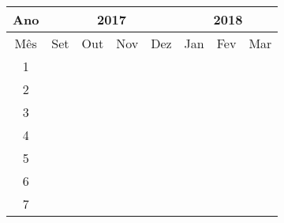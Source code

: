 \begin{tabular}{c|c|c|c|c|c|c|c} \hline
	Ano & \multicolumn{4}{|c|}{2017} & \multicolumn{3}{|c}{2018} \\ \hline
	Mês & Set & Out & Nov & Dez & Jan & Fev & Mar \\ \hline
	1   & \tp & \tp & \tp &     &     &     &     \\ \hline
	2   &     & \tn & \tn &     &     &     &     \\ \hline
	3   &     &     & \tn & \tn & \tn &     &     \\ \hline
	4   &     &     &     & \tn & \tn & \tn &     \\ \hline
	5   &     &     &     &     & \tn & \tn & \tn \\ \hline
	6   & \tn & \tn & \tn & \tn & \tn & \tn & \tn \\ \hline
	7  &     &     &     &     &     &     & \tn \\ \hline	
\end{tabular}
